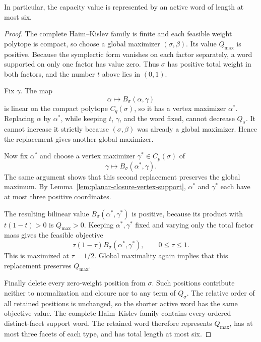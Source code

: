 \begin{unverified}
\begin{theorem}
In particular, the capacity value is represented by an active word of length
at most six.
\end{theorem}

\begin{proof}
The complete Haim--Kislev family is finite and each feasible weight polytope is
compact, so choose a global maximizer \((\sigma,\beta)\).
Its value \(Q_{\max}\) is positive.  Because the symplectic form vanishes on
each factor separately, a word supported on only one factor has value zero.
Thus \(\sigma\) has positive total weight in both factors, and the number
\(t\) above lies in \((0,1)\).

Fix \(\gamma\).  The map
\[
  \alpha\longmapsto B_\sigma(\alpha,\gamma)
\]
is linear on the compact polytope \(C_q(\sigma)\), so it has a vertex
maximizer \(\alpha^\ast\).  Replacing \(\alpha\) by \(\alpha^\ast\), while
keeping \(t\), \(\gamma\), and the word fixed, cannot decrease \(Q_\sigma\).
It cannot increase it strictly because \((\sigma,\beta)\) was already a
global maximizer.  Hence the replacement gives another global maximizer.

Now fix \(\alpha^\ast\) and choose a vertex maximizer
\(\gamma^\ast\in C_p(\sigma)\) of
\[
  \gamma\longmapsto B_\sigma(\alpha^\ast,\gamma).
\]
The same argument shows that this second replacement preserves the global
maximum.  By Lemma~\ref{lem:planar-closure-vertex-support},
\(\alpha^\ast\) and \(\gamma^\ast\) each have at most three positive
coordinates.

The resulting bilinear value
\(B_\sigma(\alpha^\ast,\gamma^\ast)\) is positive, because its product with
\(t(1-t)>0\) is \(Q_{\max}>0\).  Keeping
\(\alpha^\ast,\gamma^\ast\) fixed and varying only the total factor mass gives
the feasible objective
\[
  \tau(1-\tau)B_\sigma(\alpha^\ast,\gamma^\ast),
  \qquad 0\leq\tau\leq1.
\]
This is maximized at \(\tau=1/2\).  Global maximality again implies that this
replacement preserves \(Q_{\max}\).

Finally delete every zero-weight position from \(\sigma\).  Such positions
contribute neither to normalization and closure nor to any term of
\(Q_\sigma\).  The relative order of all retained positions is unchanged, so
the shorter active word has the same objective value.  The complete
Haim--Kislev family contains every ordered distinct-facet support word.
The retained word therefore represents \(Q_{\max}\), has at most three facets
of each type, and has total length at most six.
\end{proof}


\end{unverified}
